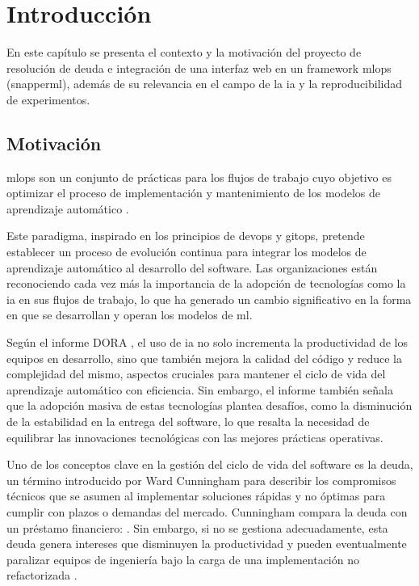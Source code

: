 \chapter{Introducción}
En este capítulo se presenta el contexto y la motivación del proyecto de resolución de \gls{deuda} e integración de una interfaz web en un \gls{framework} \acrshort{mlops} (\Gls{snapperml}), además de su relevancia en el campo de la \acrlong{ia} y la reproducibilidad de experimentos.

\section{Motivación}
\acrfull{mlops} son un conjunto de prácticas para los flujos de trabajo cuyo objetivo es optimizar el proceso de implementación y mantenimiento de los modelos de aprendizaje automático \cite{mlops}.

Este paradigma, inspirado en los principios de \Gls{devops} y \Gls{gitops}, pretende establecer un proceso de evolución continua para integrar los modelos de aprendizaje automático al desarrollo del software. Las organizaciones están reconociendo cada vez más la importancia de la adopción de tecnologías como la \acrfull{ia} en sus flujos de trabajo, lo que ha generado un cambio significativo en la forma en que se desarrollan y operan los modelos de \acrfull{ml}.

Según el informe DORA \cite{DORA}, el uso de \acrshort{ia} no solo incrementa la productividad de los equipos en desarrollo, sino que también mejora la calidad del código y reduce la complejidad del mismo, aspectos cruciales para mantener el ciclo de vida del aprendizaje automático con eficiencia. Sin embargo, el informe también señala que la adopción masiva de estas tecnologías plantea desafíos, como la disminución de la estabilidad en la entrega del software, lo que resalta la necesidad de equilibrar las innovaciones tecnológicas con las mejores prácticas operativas.

Uno de los conceptos clave en la gestión del ciclo de vida del software es la \Gls{deuda}, un término introducido por Ward Cunningham para describir los compromisos técnicos que se asumen al implementar soluciones rápidas y no óptimas para cumplir con plazos o demandas del mercado. Cunningham compara la \gls{deuda} con un préstamo financiero:  \cite{cunningham}. Sin embargo, si no se gestiona adecuadamente, esta deuda genera intereses que disminuyen la productividad y pueden eventualmente paralizar equipos de ingeniería bajo la carga de una implementación no refactorizada \cite{introtodebt}.

